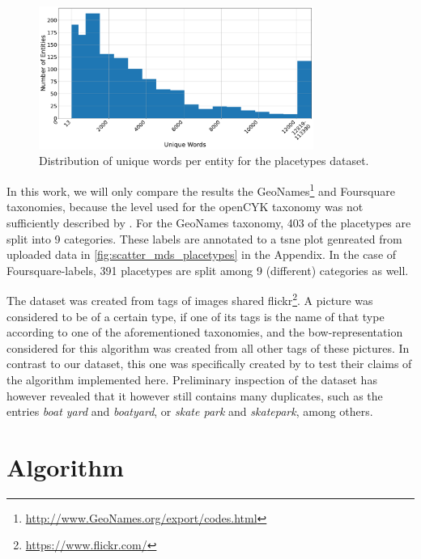 \begin{figure}[H]
	\centering
	\includegraphics[width=0.8\textwidth, height=0.23\textheight, keepaspectratio=false]{graphics/figures/placetypes_dist_unique.pdf}
	\caption{Distribution of unique words per entity for the placetypes dataset.}
	\label{fig:placetypes_dist_unique}
\end{figure}


In this work, we will only compare the results \wrt the GeoNames\footnote{\url{http://www.GeoNames.org/export/codes.html}} and Foursquare taxonomies, because the level used for the openCYK taxonomy was not sufficiently described by \textcite{Derrac2015}. For the GeoNames taxonomy, 403 of the placetypes are split into 9 categories. These labels are annotated to a \gls{tsne} plot genreated from  uploaded data in \autoref{fig:scatter_mds_placetypes} in the Appendix. In the case of Foursquare-labels, 391 placetypes are split among 9 (different) categories as well.

The dataset was created from tags of images shared flickr\footnote{\url{https://www.flickr.com/}}. A picture was considered to be of a certain type, if one of its tags is the name of that type according to one of the aforementioned taxonomies, and the \gls{bow}-representation considered for this algorithm was created from all other tags of these pictures. In contrast to our dataset, this one was specifically created by \textcite{Derrac2015} to test their claims of the algorithm implemented here. Preliminary inspection of the dataset has however revealed that it however still contains many duplicates, such as the entries \textit{boat yard} and \textit{boatyard}, or \textit{skate park} and \textit{skatepark}, among others.


\section{Algorithm}




